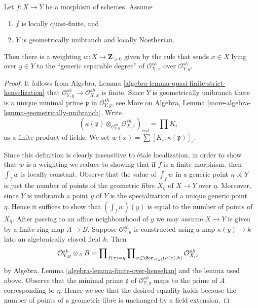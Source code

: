 \begin{lemma}
\label{lemma-weighting-quasi-finite-Noetherian}
Let $f : X \to Y$ be a morphism of schemes. Assume
\begin{enumerate}
\item $f$ is locally quasi-finite, and
\item $Y$ is geometrically unibranch and locally Noetherian.
\end{enumerate}
Then there is a weighting $w : X \to \mathbf{Z}_{\geq 0}$ given by
the rule that sends $x \in X$ lying over $y \in Y$ to the
``generic separable degree''
of $\mathcal{O}_{X, x}^{sh}$ over $\mathcal{O}_{Y, y}^{sh}$.
\end{lemma}

\begin{proof}
It follows from Algebra, Lemma
\ref{algebra-lemma-quasi-finite-strict-henselization}
that $\mathcal{O}_{Y, y}^{sh} \to \mathcal{O}_{X, x}^{sh}$
is finite. Since $Y$ is geometrically unibranch
there is a unique minimal prime $\mathfrak p$ in
$\mathcal{O}_{Y, y}^{sh}$, see
More on Algebra, Lemma \ref{more-algebra-lemma-geometrically-unibranch}.
Write
$$
(\kappa(\mathfrak p) \otimes_{\mathcal{O}_{Y, y}^{sh}}
\mathcal{O}_{X, x}^{sh})_{red} =
\prod K_i
$$
as a finite product of fields.
We set $w(x) = \sum [K_i : \kappa(\mathfrak p)]_s$.

\medskip\noindent
Since this definition is clearly insensitive to \'etale localization,
in order to show that $w$ is a weighting we reduce to showing that if
$f$ is a finite morphism, then $\int_f w$ is locally constant.
Observe that the value of $\int_f w$ in a generic point $\eta$
of $Y$ is just the number of points of the geometric fibre
$X_{\overline{\eta}}$ of $X \to Y$ over $\eta$. Moreover, since
$Y$ is unibranch a point $y$ of $Y$ is the specialization of a unique
generic point $\eta$. Hence it suffices to show that $(\int_f w)(y)$
is equal to the number of points of $X_{\overline{\eta}}$.
After passing to an affine neighbourhood of $y$ we may assume
$X \to Y$ is given by a finite ring map $A \to B$. Suppose
$\mathcal{O}_{Y, y}^{sh}$ is constructed using a map
$\kappa(y) \to k$ into an algebraically closed field $k$.
Then
$$
\mathcal{O}_{Y, y}^{sh} \otimes_A B =
\prod\nolimits_{f(x) = y}
\prod\nolimits_{\varphi \in \Mor_{\kappa(y)}(\kappa(x), k)}
\mathcal{O}_{X, x}^{sh}
$$
by Algebra, Lemma \ref{algebra-lemma-finite-over-henselian}
and the lemma used above.
Observe that the minimal prime $\mathfrak p$ of $\mathcal{O}_{Y, y}^{sh}$
maps to the prime of $A$ corresponding to $\eta$. Hence we see that
the desired equality holds because the number of points of a geometric
fibre is unchanged by a field extension.
\end{proof}